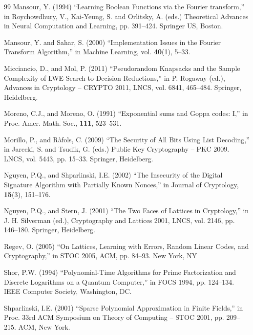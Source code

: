 \documentclass[11pt]{article}
\theoremstyle{definition}
\begin{document}
\begin{thebibliography}{99}
    {Mansour, Y. (1994)
        ``Learning Boolean Functions via the Fourier transform,'' in Roychowdhury, V., Kai-Yeung, S. and Orlitsky, A. (eds.) Theoretical Advances in Neural Computation and Learning, pp. 391--424. Springer US, Boston.}

    {Mansour, Y. and Sahar, S. (2000)
        ``Implementation Issues in the Fourier Transform Algorithm,'' in Machine Learning, vol. \textbf{40}(1), 5--33.}

    {Micciancio, D., and Mol, P. (2011)
        ``Pseudorandom Knapsacks and the Sample Complexity of LWE Search-to-Decision Reductions,'' in P. Rogaway (ed.),  Advances in Cryptology -- CRYPTO 2011, LNCS, vol. 6841, 465--484. Springer, Heidelberg.}

    {Moreno, C.J., and Moreno, O. (1991)
        ``Exponential sums and Goppa codes: I,'' in Proc. Amer. Math. Soc., \textbf{111}, 523--531.}

    {Morillo, P., and R{\`a}fols, C. (2009)
        ``The Security of All Bits Using List Decoding,'' in Jarecki, S. and Tsudik, G. (eds.) Public Key Cryptography -- PKC 2009. LNCS, vol. 5443, pp. 15--33. Springer, Heidelberg.}

    {Nguyen, P.Q., and Shparlinski, I.E. (2002)
        ``The Insecurity of the Digital Signature Algorithm with Partially Known Nonces,'' in Journal of Cryptology, \textbf{15}(3), 151--176.}

    {Nguyen, P.Q., and Stern, J. (2001)
        ``The Two Faces of Lattices in Cryptology,'' in J. H. Silverman (ed.), Cryptography and Lattices 2001, LNCS, vol. 2146, pp. 146--180. Springer, Heidelberg.}

    {Regev, O. (2005)
        ``On Lattices, Learning with Errors, Random Linear Codes, and Cryptography,'' in STOC 2005, ACM, pp. 84--93. New York, NY}

    {Shor, P.W. (1994)
        ``Polynomial-Time Algorithms for Prime Factorization and Discrete Logarithms on a Quantum Computer,'' in FOCS 1994, pp. 124--134. IEEE Computer Society, Washington, DC.}

    {Shparlinski, I.E. (2001)
        ``Sparse Polynomial Approximation in Finite Fields,'' in Proc. 33rd ACM Symposium on Theory of Computing -- STOC 2001, pp. 209--215. ACM, New York.}



\end{thebibliography}
\end{document}
